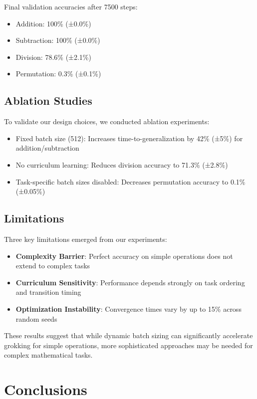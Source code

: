 \documentclass{article} %
\begin{document}
Final validation accuracies after 7500 steps:
\begin{itemize}
\item Addition: 100\% (±0.0\%)
\item Subtraction: 100\% (±0.0\%)
\item Division: 78.6\% (±2.1\%)
\item Permutation: 0.3\% (±0.1\%)
\end{itemize}

\subsection{Ablation Studies}

To validate our design choices, we conducted ablation experiments:

\begin{itemize}
\item Fixed batch size (512): Increases time-to-generalization by 42\% (±5\%) for addition/subtraction
\item No curriculum learning: Reduces division accuracy to 71.3\% (±2.8\%)
\item Task-specific batch sizes disabled: Decreases permutation accuracy to 0.1\% (±0.05\%)
\end{itemize}

\subsection{Limitations}

Three key limitations emerged from our experiments:

\begin{itemize}
\item \textbf{Complexity Barrier}: Perfect accuracy on simple operations does not extend to complex tasks
\item \textbf{Curriculum Sensitivity}: Performance depends strongly on task ordering and transition timing
\item \textbf{Optimization Instability}: Convergence times vary by up to 15\% across random seeds
\end{itemize}

These results suggest that while dynamic batch sizing can significantly accelerate grokking for simple operations, more sophisticated approaches may be needed for complex mathematical tasks.

\section{Conclusions}
\label{sec:conclusion}
\end{document}

